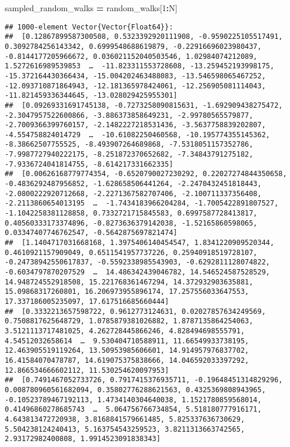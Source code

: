\documentclass[
]{article}
\newenvironment{Shaded}{\begin{snugshade}}{\end{snugshade}}
\newcommand{\FloatTok}[1]{\textcolor[rgb]{0.00,0.00,0.81}{#1}}
\newcommand{\NormalTok}[1]{#1}
\newcommand{\OperatorTok}[1]{\textcolor[rgb]{0.81,0.36,0.00}{\textbf{#1}}}
\begin{document}
\begin{Shaded}
\begin{Highlighting}[]
\NormalTok{sampled\_random\_walks }\OperatorTok{=}\NormalTok{ random\_walks[}\FloatTok{1}\OperatorTok{:}\NormalTok{N]}
\end{Highlighting}
\end{Shaded}

\begin{verbatim}
## 1000-element Vector{Vector{Float64}}:
##  [0.12867899587300508, 0.5323392920111908, -0.9590225105517491, 0.3092784256143342, 0.6999548688619879, -0.22916696023980437, -0.8144177205966672, 0.036021152040503546, 1.02984074212089, 1.5272616989539853  …  -11.823311553728608, -13.259452193998175, -15.372164430366434, -15.004202463488083, -13.546598065467252, -12.093710871864943, -12.181365978424061, -12.256905081114043, -11.821459336344645, -13.028029425955301]
##  [0.09269331691745138, -0.7273258090815631, -1.692909438275472, -2.3047957522600866, -3.886373858649231, -2.99780565579877, -2.7009366399760157, -2.1482227218531436, -3.5637758839202807, -4.554758824014729  …  -10.61082250460568, -10.195774355145362, -8.38662507755525, -8.493907264689868, -7.5318051157352786, -7.9987727940222175, -8.251872370652682, -7.34843791275182, -7.9336724041814755, -8.614217331662335]
##  [0.00626168779774354, -0.6520790027230292, 0.22027274844350658, -0.4836292487956852, -1.628658506441264, -2.2470432451818443, -2.0800222920712668, -2.2271367582707406, -2.100711337356408, -2.2113860654013195  …  -1.7434183966204284, -1.7005422891807527, -1.1042258381128858, 0.7332721715845583, 0.6997587728413817, 0.40560333173374896, -0.8273636379142038, -1.52165860598065, 0.03347407746762547, -0.5642875697821474]
##  [1.1404717031668168, 1.3975406140454547, 1.8341220909520344, 0.4610921157909049, 0.6511541957737226, 0.25940918519728107, -0.24738942550617837, -0.5592338985543903, -0.6292811128074822, -0.6034797870207529  …  14.486342439046782, 14.546524587528529, 14.948724552918508, 15.221768361467294, 14.372932903635881, 15.09868317260801, 16.206973955896174, 17.257556033647553, 17.337186005235097, 17.617516685660444]
##  [0.3332213657598722, 0.9612773124631, 0.02027857634249569, 0.7508817625648729, 1.0785879381026882, 1.8787135864254063, 3.5121113717481025, 4.262728445866246, 4.828494698555791, 4.54512032658614  …  9.530404710588911, 11.66549933738195, 12.463905519119264, 13.50953985606601, 14.914957976837702, 16.41584070478787, 14.619075375838666, 14.046592033397292, 12.866534666602112, 11.530254620097953]
##  [0.7491467052733726, 0.7917415376935711, -0.19648451314829296, 0.008780960561682094, 0.35802776288621563, 0.4325369808943965, -0.10523789467192113, 1.4734140304640038, 1.1521780859568014, 0.41496860278685743  …  5.064756766734854, 5.518180777916171, 4.643813472720938, 3.8168841579661485, 5.825337636730629, 5.504238124240413, 5.163754543259523, 3.8211313663742565, 2.93172982400808, 1.9914523091838343]

\end{verbatim}
\end{document}
